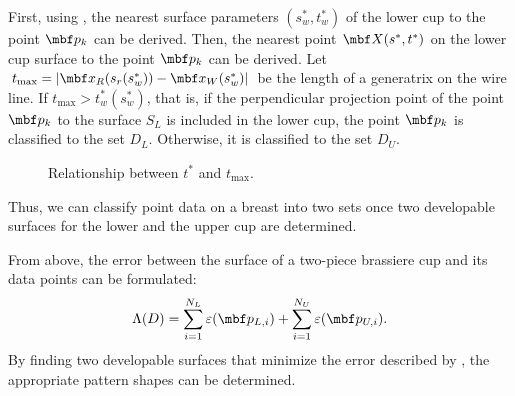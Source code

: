 \documentclass[E]{scitrans}
\begin{document}
First, using , the nearest surface parameters $ (s_w^*, t_w^*) $ of the lower cup to the point $ \mbold{p}_k $ can be derived. Then, the nearest point $ \mbold{X}(s^*, t^*) $ on the lower cup surface to the point $ \mbold{p}_k $ can be derived. Let $ t_{\max}=|\mbold{x}_R (s_r (s_w^* ))-\mbold{x}_W (s_w^* )| $ be the length of a generatrix on the wire line. If $ t_{\max} > t_w^*(s_w^*) $, that is, if the perpendicular projection point of the point $ \mbold{p}_k $ to the surface $ S_L $ is included in the lower cup, the point $ \mbold{p}_k $ is classified to the set $ D_L $. Otherwise, it is classified to the set $ D_U $. 
\begin{figure}[thpb]
	\centering
	\hfil
	\caption{Relationship between $ t^*$ and $t_{\max}$.}
	\label{fig:which_in}
\end{figure}

Thus, we can classify point data on a breast into two sets once two developable surfaces for the lower and the upper cup are determined.

From above, the error between the surface of a two-piece brassiere cup and its data points can be formulated:
\begin{equation}\label{eq:Lambda_eq}
\Lambda(D) = \sum_{i=1}^{N_L} \varepsilon(\mbold{p}_{L,i}) + \sum_{i=1}^{N_U} \varepsilon(\mbold{p}_{U,i}).
\end{equation}
By finding two developable surfaces that minimize the error described by , the appropriate pattern shapes can be determined.
\end{document}
